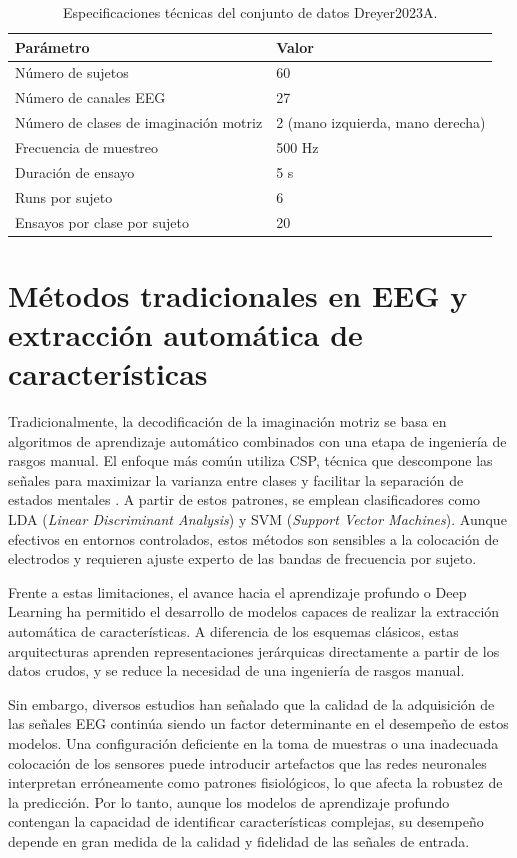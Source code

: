 \begin{table}[h]
	\centering
	\caption[dataset dreyer]{Especificaciones técnicas del conjunto de datos \mbox{Dreyer2023A}.}
	\begin{tabular}{L{8cm} L{4cm}}
		\toprule
		\textbf{Parámetro} & \textbf{Valor} \\
		\midrule
		Número de sujetos           	& 60 \\
		Número de canales EEG        & 27 \\
		Número de clases de imaginación motriz 	& 2 (mano izquierda, mano derecha) \\
		Frecuencia de muestreo  		& 500 Hz \\
		Duración de ensayo  		    & 5 s \\
		Runs por sujeto				& 6 \\
		Ensayos por clase por sujeto & 20 \\
		\bottomrule
	\end{tabular}
	\label{tab:dataset-dreyer}
\end{table}

\section{Métodos tradicionales en EEG y extracción automática de características}
Tradicionalmente, la decodificación de la imaginación motriz se basa en algoritmos de aprendizaje automático combinados con una etapa de ingeniería de rasgos manual. El enfoque más común utiliza CSP, técnica que descompone las señales para maximizar la varianza entre clases y facilitar la separación de estados mentales \cite{riascos2024machine}. A partir de estos patrones, se emplean clasificadores como LDA (\textit{Linear Discriminant Analysis}) y SVM (\textit{Support Vector Machines}). Aunque efectivos en entornos controlados, estos métodos son sensibles a la colocación de electrodos y requieren ajuste experto de las bandas de frecuencia por sujeto.

Frente a estas limitaciones, el avance hacia el aprendizaje profundo o Deep Learning ha permitido el desarrollo de modelos capaces de realizar la extracción automática de características. A diferencia de los esquemas clásicos, estas arquitecturas aprenden representaciones jerárquicas directamente a partir de los datos crudos, y se reduce la necesidad de una ingeniería de rasgos manual.

Sin embargo, diversos estudios han señalado que la calidad de la adquisición de las señales EEG continúa siendo un factor determinante en el desempeño de estos modelos. Una configuración deficiente en la toma de muestras o una inadecuada colocación de los sensores puede introducir artefactos que las redes neuronales interpretan erróneamente como patrones fisiológicos, lo que afecta la robustez de la predicción. Por lo tanto, aunque los modelos de aprendizaje profundo contengan la capacidad de identificar características complejas, su desempeño depende en gran medida de la calidad y fidelidad de las señales de entrada.

